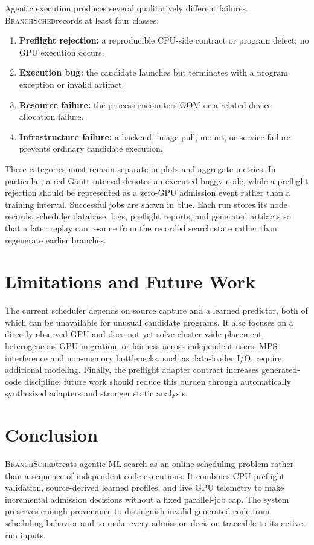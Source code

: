 \documentclass{article}
\newcommand{\method}{\textsc{BranchSched}}
\begin{document}
Agentic execution produces several qualitatively different failures. \method records at least four classes:
\begin{enumerate}
  \item \textbf{Preflight rejection:} a reproducible CPU-side contract or program defect; no GPU execution occurs.
  \item \textbf{Execution bug:} the candidate launches but terminates with a program exception or invalid artifact.
  \item \textbf{Resource failure:} the process encounters OOM or a related device-allocation failure.
  \item \textbf{Infrastructure failure:} a backend, image-pull, mount, or service failure prevents ordinary candidate execution.
\end{enumerate}

These categories must remain separate in plots and aggregate metrics. In particular, a red Gantt interval denotes an executed buggy node, while a preflight rejection should be represented as a zero-GPU admission event rather than a training interval. Successful jobs are shown in blue. Each run stores its node records, scheduler database, logs, preflight reports, and generated artifacts so that a later replay can resume from the recorded search state rather than regenerate earlier branches.

\section{Limitations and Future Work}
\label{sec:limitations}

The current scheduler depends on source capture and a learned predictor, both of which can be unavailable for unusual candidate programs. It also focuses on a directly observed GPU and does not yet solve cluster-wide placement, heterogeneous GPU migration, or fairness across independent users. MPS interference and non-memory bottlenecks, such as data-loader I/O, require additional modeling. Finally, the preflight adapter contract increases generated-code discipline; future work should reduce this burden through automatically synthesized adapters and stronger static analysis.

\section{Conclusion}
\label{sec:conclusion}

\method treats agentic ML search as an online scheduling problem rather than a sequence of independent code executions. It combines CPU preflight validation, source-derived learned profiles, and live GPU telemetry to make incremental admission decisions without a fixed parallel-job cap. The system preserves enough provenance to distinguish invalid generated code from scheduling behavior and to make every admission decision traceable to its active-run inputs.
\end{document}
